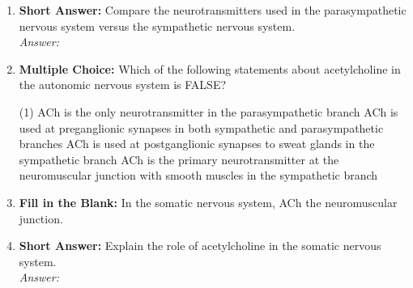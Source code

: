 \begin{enumerate}[label=\textbf{Q3.4.\arabic*}]
    \item \textbf{Short Answer:} Compare the neurotransmitters used in the parasympathetic nervous system versus the sympathetic nervous system. \\
        \textit{Answer:} %

    \item \textbf{Multiple Choice:} Which of the following statements about acetylcholine in the autonomic nervous system is FALSE?
        \begin{tasks}[label=\textcolor{\documentTheme}{(\Alph*)}, item-format=\color{\documentTheme}, label-width=1.5em, item-indent=1.7em](1)
            \task ACh is the only neurotransmitter in the parasympathetic branch
            \task ACh is used at preganglionic synapses in both sympathetic and parasympathetic branches
            \task ACh is used at postganglionic synapses to sweat glands in the sympathetic branch
            \task ACh is the primary neurotransmitter at the neuromuscular junction with smooth muscles in the sympathetic branch
        \end{tasks}

    \item \textbf{Fill in the Blank:} In the somatic nervous system, ACh \underline{\hspace{3cm}} the neuromuscular junction.

    \item \textbf{Short Answer:} Explain the role of acetylcholine in the somatic nervous system. \\
        \textit{Answer:} %


\end{enumerate}
